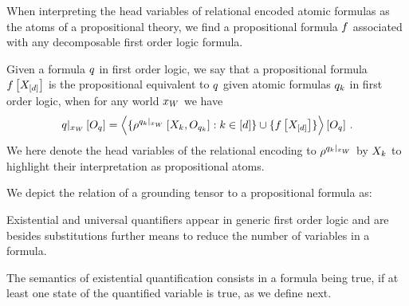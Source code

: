 When interpreting the head variables of relational encoded atomic formulas as the atoms of a propositional theory, we find a propositional formula $f$ associated with any decomposable first order logic formula.

\begin{definition}
    \label{def:propositionalEquivalent}
    Given a formula $q$ in first order logic, we say that a propositional formula $f\left[X_{[d]}\right]$ is the propositional equivalent to $q$ given atomic formulas $q_{k}$ in first order logic, when for any world $x_{W}$ we have
    \begin{align*}
        {q}|_{x_{W}} \left[O_{q}\right]
        = \left\langle 
            \{\rho^{{q_{k}}|_{x_{W}}}\left[X_{k},O_{q_{k}}\right] : k\in[d]\}
            \cup \{f\left[X_{[d]}\right]\}
        \right\rangle \left[ O_{q} \right] \, .
    \end{align*}
    We here denote the head variables of the relational encoding to $\rho^{{q_{k}}|_{x_{W}}}$ by $X_{k}$ to highlight their interpretation as propositional atoms.
\end{definition}

We depict the relation of a grounding tensor to a propositional formula as:
\begin{center}
    
\end{center}



Existential and universal quantifiers appear in generic first order logic and are besides substitutions further means to reduce the number of variables in a formula.


The semantics of existential quantification consists in a formula being true, if at least one state of the quantified variable is true, as we define next.


